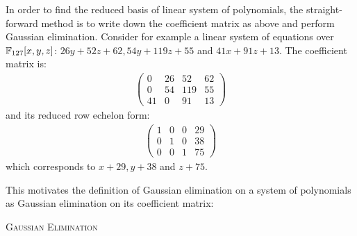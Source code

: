 In order to find the reduced basis of linear system of polynomials, the straight-forward method is to write down the coefficient matrix as above and perform Gaussian elimination. Consider for example a linear system of equations over $\mathbb{F}_{127}[x, y, z]$: $26y + 52z + 62, 54y + 119z + 55$ and $41x + 91z + 13$. The coefficient matrix is:
\begin{align*}
\left(\begin{array}{rrrr}
0 & 26 & 52 & 62 \\
0 & 54 & 119 & 55 \\
41 & 0 & 91 & 13
\end{array}\right)
\end{align*}
and its reduced row echelon form:
\begin{align*}
\left(\begin{array}{rrrr}
1 & 0 & 0 & 29 \\
0 & 1 & 0 & 38 \\
0 & 0 & 1 & 75
\end{array}\right)
\end{align*}
which corresponds to $x + 29, y + 38$ and $z + 75$.

This motivates the definition of Gaussian elimination on a system of polynomials as Gaussian elimination on its coefficient matrix:

\begin{algorithm}[ht]

\caption{\textsc{Gaussian Elimination}}
\label{alg:gausselim}
\end{algorithm}

